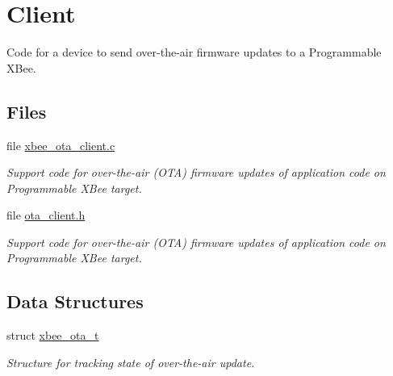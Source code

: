 \hypertarget{group__xbee__ota__client}{\section{Client}
\label{group__xbee__ota__client}
}


Code for a device to send over-\/the-\/air firmware updates to a Programmable X\-Bee.  


\subsection*{Files}
\begin{DoxyCompactItemize}
\item 
file \hyperlink{xbee__ota__client_8c}{xbee\-\_\-ota\-\_\-client.\-c}
\begin{DoxyCompactList}\small\item\em Support code for over-\/the-\/air (O\-T\-A) firmware updates of application code on Programmable X\-Bee target. \end{DoxyCompactList}\item 
file \hyperlink{ota__client_8h}{ota\-\_\-client.\-h}
\begin{DoxyCompactList}\small\item\em Support code for over-\/the-\/air (O\-T\-A) firmware updates of application code on Programmable X\-Bee target. \end{DoxyCompactList}\end{DoxyCompactItemize}
\subsection*{Data Structures}
\begin{DoxyCompactItemize}
\item 
struct \hyperlink{structxbee__ota__t}{xbee\-\_\-ota\-\_\-t}
\begin{DoxyCompactList}\small\item\em Structure for tracking state of over-\/the-\/air update. \end{DoxyCompactList}\end{DoxyCompactItemize}
